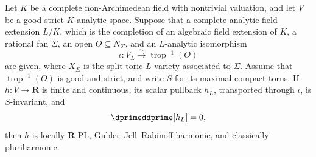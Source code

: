 
\begin{corollary}
\label{cor:p062-algebraic-split-invariant-scalar-stable-zero-current}
Let \(K\) be a complete non-Archimedean field with nontrivial valuation, and
let \(V\) be a good strict \(K\)-analytic space.  Suppose that a complete
analytic field extension \(L/K\), which is the completion of an algebraic
field extension of \(K\), a rational fan \(\Sigma\), an open
\(O\subseteq N_\Sigma\), and an \(L\)-analytic isomorphism
\[
          \iota:V_L\xrightarrow{\sim}\operatorname{trop}^{-1}(O)
\]
are given, where \(X_\Sigma\) is the split toric \(L\)-variety associated to
\(\Sigma\).  Assume that \(\operatorname{trop}^{-1}(O)\) is good and
strict, and write \(S\) for its maximal compact torus.  If
\(h:V\to\mathbf R\) is finite and continuous, its scalar pullback \(h_L\),
transported through \(\iota\), is \(S\)-invariant, and
\[
                         \dprimeddprime[h_L]=0,
\]
then \(h\) is locally \(\mathbf R\)-PL, Gubler--Jell--Rabinoff harmonic,
and classically pluriharmonic.
\end{corollary}
